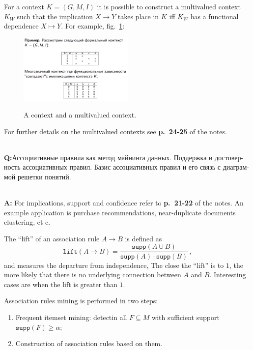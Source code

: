 \documentclass[a4paper,14pt]{extarticle}
\newcommand{\rus}[1]{\foreignlanguage{russian}{#1}}
\begin{document}
For a context $K=(G, M, I)$ it is possible to construct a multivalued context
$K_W$ such that the implication $X\to Y$ takes place in $K$ iff $K_W$ has a functional
dependence $X\mapsto Y$. For example, fig.~\ref{fig:multivalued}:
\begin{figure}
    \centering
    \includegraphics[width=0.5\textwidth]{multivalued.png}
    \label{fig:multivalued}
    \caption{A context and a multivalued context.}
\end{figure}
For further details on the multivalued contexts see \textbf{p.~24-25} of the notes.

\hfill\\\textbf{Q:}\rus{Ассоциативные правила как метод майнинга данных. Поддержка
и достоверность ассоциативных правил. Базис ассоциативных правил и его связь с диаграммой
решетки понятий.}

\hfill\\\textbf{A:}
For implications, support and confidence refer to \textbf{p.~21-22} of the notes.
An example application is purchase recommendations, near-duplicate documents clustering,
et c.

The ``lift'' of an association rule $A\to B$ is defined as 
$$ \mathtt{lift}(A\to B)
    = \frac{\mathtt{supp}(A\cup B)}{\mathtt{supp}(A)\cdot \mathtt{supp}(B)}
    \,, $$
and measures the departure from independence, The close the ``lift'' is to $1$,
the more likely that there is no underlying connection between $A$ and $B$. Interesting
cases are when the lift is greater than $1$. 

Association rules mining is performed in two steps: \begin{enumerate}
    \item Frequent itemset mining: detectin all $F \subseteq M$ with sufficient
    support $\mathtt{supp}(F)\geq \alpha$;
    \item Construction of association rules based on them.
\end{enumerate}
\end{document}
